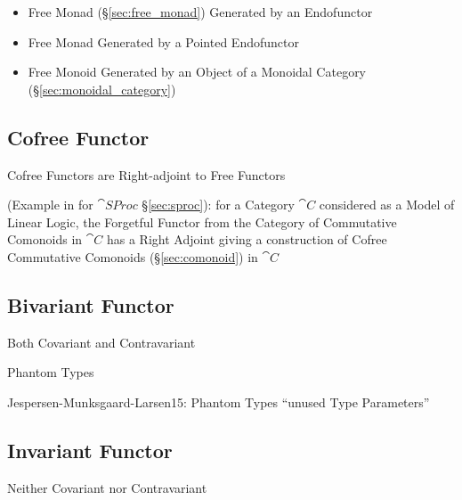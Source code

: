 \begin{itemize}
  \item Free Monad (\S\ref{sec:free_monad}) Generated by an Endofunctor
  \item Free Monad Generated by a Pointed Endofunctor
  \item Free Monoid Generated by an Object of a Monoidal Category
    (\S\ref{sec:monoidal_category})
\end{itemize}



\subsection{Cofree Functor}\label{sec:cofree_functor}

Cofree Functors are Right-adjoint to Free Functors

(Example in \cite{abramsky-gay-nagarajan96} for $\cat{SProc}$
\S\ref{sec:sproc}): for a Category $\cat{C}$ considered as a Model of
Linear Logic, the Forgetful Functor from the Category of Commutative
Comonoids in $\cat{C}$ has a Right Adjoint giving a construction of
Cofree Commutative Comonoids (\S\ref{sec:comonoid}) in $\cat{C}$



\subsection{Bivariant Functor} \label{sec:bivariant_functor}

Both Covariant and Contravariant

Phantom Types %

Jespersen-Munksgaard-Larsen15: Phantom Types ``unused Type
Parameters''



\subsection{Invariant Functor} \label{sec:invariant_functor}

Neither Covariant nor Contravariant



